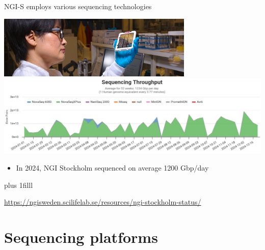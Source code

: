 \documentclass[10pt]{beamer}
\newcommand{\credit}[1]{{\vskip0pt plus 1filll \par \raggedleft \scriptsize \mdseries \color{mDarkBrown} #1 \par}}
\begin{document}
\begin{frame}{NGI-S employs various sequencing technologies}
	\begin{center}
		\includegraphics[width=0.7\textwidth]{./figures/ngi-choi-flowcell.jpg} \\
		\hspace*{-1cm}
		\includegraphics[width=1.2\textwidth]{./figures/ngis-throughput-2024.png}
	\end{center}
	\begin{itemize}
		\item In 2024, NGI Stockholm sequenced on average 1200 Gbp/day
	\end{itemize}
	\credit{\href{https://ngisweden.scilifelab.se/resources/ngi-stockholm-status/}{https://ngisweden.scilifelab.se/resources/ngi-stockholm-status/}}
\end{frame}


\section{Sequencing platforms}

\end{document}
